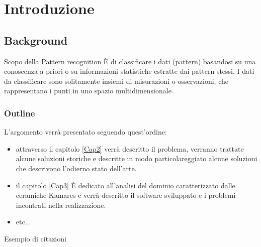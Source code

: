 \chapter{Introduzione} 
\label{Cap1}

\section{Background}
Scopo della Pattern recognition È di classificare i dati (pattern) basandosi su una conoscenza a priori o su informazioni statistiche estratte 
dai pattern stessi. I dati da classificare sono solitamente insiemi di misurazioni o osservazioni, che rappresentano i punti in uno spazio 
multidimensionale.
\subsection{Outline}
L'argomento verrà presentato seguendo quest'ordine:
\begin{itemize}
\item attraverso il capitolo \ref{Cap2} verrà descritto il problema, verranno trattate alcune soluzioni storiche e descritte in 
modo particolareggiato alcune soluzioni che descrivono l'odierno stato dell'arte.
\item il capitolo \ref{Cap3} È dedicato all'analisi del dominio caratterizzato dalle ceramiche Kamares e verrà descritto il software sviluppato
e i problemi incontrati nella realizzazione.
\item etc...
\end{itemize}

Esempio di citazioni 
\cite{Friedman98additivelogistic}
\cite{McneillV06}
\cite{McneillV05}
\cite{Xu09}